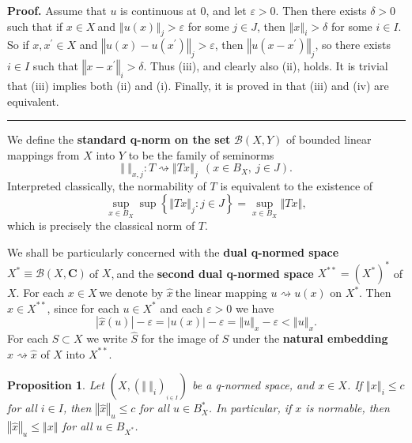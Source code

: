 \documentclass[11pt]{article}%
\newtheorem{proposition}[theorem]{Proposition}
\newenvironment{proof}[1][Proof]{\noindent\textbf{#1.} }{\ \rule{0.5em}{0.5em}}
\begin{document}
\begin{proof}
Assume that $u$ is continuous at $0$, and let $\varepsilon>0$. Then there
exists $\delta>0$ such that if $x\in X\ $and $\left\Vert u(x)\right\Vert
_{j}>\varepsilon$ for some $j\in J$, then $\left\Vert x\right\Vert _{i}%
>\delta$ for some $i\in I$. So if $x,x^{\prime}\in X$ and $\left\Vert
u(x)-u(x^{\prime})\right\Vert _{j}>\varepsilon$, then $\left\Vert
u(x-x^{\prime})\right\Vert _{j}$, so there exists $i\in I$ such that
$\left\Vert x-x^{\prime}\right\Vert _{i}>\delta$. Thus (iii), and clearly also
(ii), holds. It is trivial that (iii) implies both (ii) and (i). Finally, it
is proved in \cite[Chap. 7, Prop. 5.6]{BB} that (iii) and (iv) are equivalent.
\end{proof}

%

\medskip


We define the \textbf{standard q-norm on the set} $\mathcal{B}(X,Y)$ of
bounded linear mappings from $X$ into $Y$ to be the family of seminorms%
\[
\left\Vert \ \right\Vert _{x,j}:T\rightsquigarrow\left\Vert Tx\right\Vert
_{j}\ \ \left(  x\in B_{X},~j\in J\right)  .
\]
Interpreted classically, the normability of $T$ is equivalent to the existence
of%
\[
\sup_{x\in B_{X}}\sup\left\{  \left\Vert Tx\right\Vert _{j}:j\in J\right\}
=\sup_{x\in B_{X}}\left\Vert Tx\right\Vert ,
\]
which is precisely the classical norm of $T$.

We shall be particularly concerned with the \textbf{dual q-normed space}
$X^{\ast}\equiv\mathcal{B}(X,\mathbf{C})\ $of $X$,$\ $and the \textbf{second
dual q-normed space} $X^{\ast\ast}=(X^{\ast})^{\ast}$ of $X$. For each $x\in
X\ $we denote by $\widehat{x}\ $the linear mapping $u\rightsquigarrow u(x)$ on
$X^{\ast}$. Then $\widehat{x}\in X^{\ast\ast}$, since for each $u\in X^{\ast}$
and each $\varepsilon>0$ we have
\[
\left\vert \widehat{x}(u)\right\vert -\varepsilon=\left\vert u(x)\right\vert
-\varepsilon=\left\Vert u\right\Vert _{x}-\varepsilon<\left\Vert u\right\Vert
_{x}.
\]
For each $S\subset X$ we write $\widehat{S}$ for the image of $S$ under the
\textbf{natural embedding }$x\rightsquigarrow\widehat{x}$ of $X$ into
$X^{\ast\ast}$.

\begin{proposition}
\label{feb13p2}Let $\left(  X,(\left\Vert \ \right\Vert _{i})_{_{i\in I}%
}\right)  $ be a q-normed space, and $x\in X$. If $\left\Vert x\right\Vert
_{i}\leq c$ for all $i\in I$, then $\left\Vert \widehat{x}\right\Vert _{u}\leq
c$ for all $u\in B_{X}^{\ast}$. In particular, if $x$ is normable, then
$\left\Vert \widehat{x}\right\Vert _{u}\leq\left\Vert x\right\Vert $ for all
$u\in B_{X^{\ast}}$.
\end{proposition}
\end{document}
